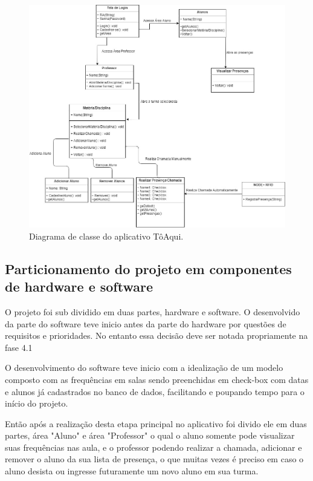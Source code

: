\documentclass[12pt]{article}
\begin{document}
\begin{figure}[H]
\centering
\includegraphics[scale=.35]{DCU.jpg}
\caption{Diagrama de classe do aplicativo TôAqui.}
\end{figure}


\subsection{Particionamento do projeto em componentes de hardware e software}

O projeto foi sub dividido em duas partes, hardware e software. O desenvolvido da parte do software teve inicio antes da parte do hardware por questões de requisitos e prioridades. No entanto essa decisão deve ser notada propriamente na fase 4.1

O desenvolvimento do software teve inicio com a idealização de um modelo composto com as frequências em salas sendo preenchidas em check-box com datas e alunos já cadastrados no banco de dados, facilitando e poupando tempo para o início do projeto.

Então após a realização desta etapa principal no aplicativo foi divido ele em duas partes, área "Aluno" e área "Professor" o qual o aluno somente pode visualizar suas frequências nas aula, e o professor podendo realizar a chamada, adicionar e remover o aluno da sua lista de presença, o que muitas vezes é preciso em caso o aluno desista ou ingresse futuramente um novo aluno em sua turma.
\end{document}
